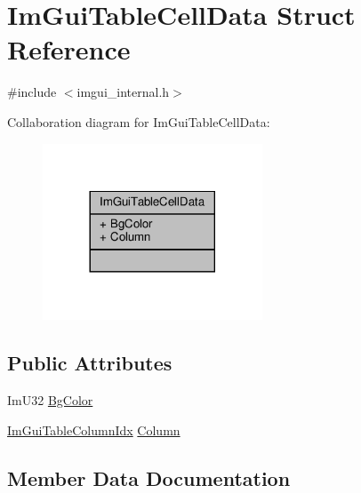 \hypertarget{structImGuiTableCellData}{}\section{Im\+Gui\+Table\+Cell\+Data Struct Reference}
\label{structImGuiTableCellData}


{\ttfamily \#include $<$imgui\+\_\+internal.\+h$>$}



Collaboration diagram for Im\+Gui\+Table\+Cell\+Data\+:
\nopagebreak
\begin{figure}[H]
\begin{center}
\leavevmode
\includegraphics[width=185pt]{structImGuiTableCellData__coll__graph}
\end{center}
\end{figure}
\subsection*{Public Attributes}
\begin{DoxyCompactItemize}
\item 
Im\+U32 \hyperlink{structImGuiTableCellData_a439b292f657214a1e2cfe1ce05c5ab60}{Bg\+Color}
\item 
\hyperlink{imgui__internal_8h_abe1882c8292cd23a77a54eda2407f147}{Im\+Gui\+Table\+Column\+Idx} \hyperlink{structImGuiTableCellData_af7a86d9930e122fcd98c28f076fc68cc}{Column}
\end{DoxyCompactItemize}


\subsection{Member Data Documentation}
\mbox{\label{structImGuiTableCellData_a439b292f657214a1e2cfe1ce05c5ab60}} 
